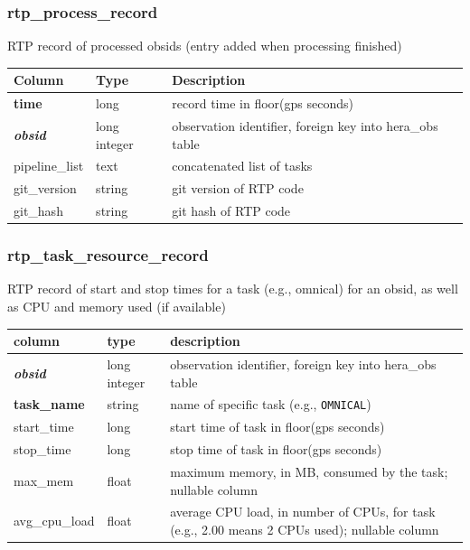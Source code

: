\documentclass{article}
\begin{document}
{\subsubsection{rtp\_process\_record}
RTP record of processed obsids (entry added when processing finished)
\begin{center}
 \begin{tabular}{| p{4cm} | p{2cm} | p{10cm} |}
\hline
 {\bf Column} & {\bf Type}  & {\bf Description} \\ [0.5ex]  \hline\hline
\textbf{time} & long & record time in floor(gps seconds)\\ \hline
\textit{\textbf{obsid}} & long integer & observation identifier, foreign key into hera\_obs table \\ \hline
pipeline\_list & text & concatenated list of tasks  \\\hline
git\_version & string & git version of RTP code  \\\hline
git\_hash & string & git hash of RTP code  \\\hline
\end{tabular}
\end{center}

\subsubsection{rtp\_task\_resource\_record}
RTP record of start and stop times for a task (e.g., omnical) for an obsid, as well as CPU and memory used (if available)
\begin{center}
  \begin{tabular}{| p{4cm} | p{2cm} | p{10cm} |}
\hline
 column & type & description \\ [0.5ex] \hline\hline
\textit{\textbf{obsid}} & long integer & observation identifier, foreign key into hera\_obs table \\ \hline
\textbf{task\_name} & string & name of specific task (e.g., \verb+OMNICAL+) \\ \hline
start\_time & long & start time of task in floor(gps seconds) \\ \hline
stop\_time & long & stop time of task in floor(gps seconds) \\ \hline
max\_mem & float & maximum memory, in MB, consumed by the task; nullable column \\ \hline
avg\_cpu\_load & float & average CPU load, in number of CPUs, for task (e.g., 2.00 means 2 CPUs used); nullable column \\ \hline
\end{tabular}
\end{center}



}
\end{document}
